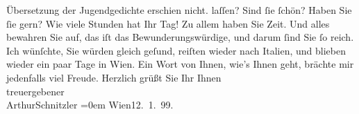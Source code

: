 \begin{ledgroupsized}[t]{13cm}
{{{                        Übersetzung der Jugendgedichte erschien nicht.}}}\label{K_L00880_5h} laſſen? Sind ſie
                    ſchön? Haben Sie ſie gern? Wie viele Stunden hat Ihr Tag! Zu allem haben Sie
                    Zeit. Und alles bewahren Sie auf, das iſt das Bewunderungswürdige, und darum {\pb}ſind Sie ſo reich.\pend
           \pstart
           Ich wünſchte, Sie würden gleich geſund, reiſten wieder nach Italien, und blieben wieder ein paar Tage in Wien. Ein Wort von Ihnen, wie’s Ihnen geht,
                    brächte mir jedenfalls viel Freude.\pend
           \pstart
           Herzlich grüßt Sie Ihr Ihnen {\\[\baselineskip]}treuergebener{\\[\baselineskip]}\spacefill\mbox{ArthurSchnitzler}\pend
           \leftskip=0em{}\pstart
           Wien12. 1. 99.\pend
           \endnumbering{}\end{ledgroupsized}  \newcommand{\dateiname}{L00880}\newcommand{\titel}{Arthur Schnitzler an Georg Brandes, 12. 1. 1899}\newcommand{\editorInnen}{Martin Anton Müller und Gerd-Hermann Susen}
      